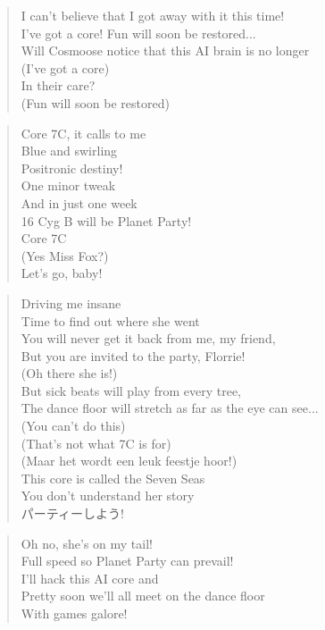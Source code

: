 
\begin{verse}
I can't believe that I got away with it this time! \\
I've got a core! Fun will soon be restored... \\
Will Cosmoose notice that this AI brain is no longer \\
(I've got a core)  \\
In their care? \\
(Fun will soon be restored)
\end{verse}

\begin{verse}
Core 7C, it calls to me \\
Blue and swirling \\
Positronic destiny! \\
One minor tweak  \\
And in just one week \\
16 Cyg B will be Planet Party! \\
Core 7C \\
(Yes Miss Fox?)\\
Let's go, baby!
\end{verse}

\clearpage
{}

\begin{verse}
Driving me insane \\
Time to find out where she went \\

You will never get it back from me, my friend, \\
But you are invited to the party, Florrie! \\
(Oh there she is!) \\
But sick beats will play from every tree, \\
The dance floor will stretch as far as the eye can see... \\
(You can't do this) \\
(That's not what 7C is for) \\
(Maar het wordt een leuk feestje hoor!) \\
This core is called the Seven Seas  \\
You don't understand her story \\
パーティーしよう!
\end{verse}


\begin{verse}
Oh no, she's on my tail! \\
Full speed so Planet Party can prevail! \\
I'll hack this AI core and \\
Pretty soon we'll all meet on the dance floor \\
With games galore!
\end{verse}


